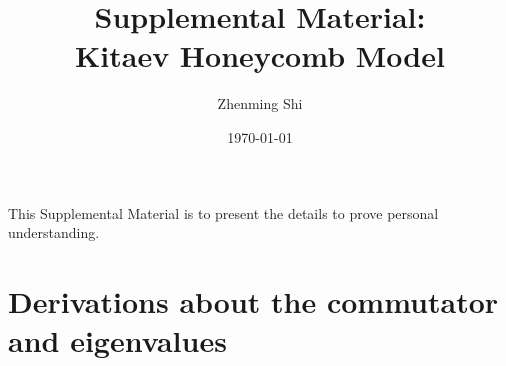 \documentclass[
  aps,
  prl,
  preprint,
  amsmath,
  amssymb,
  superscriptaddress,
  floatfix
]{revtex4-2}
\begin{document}
\title{Supplemental Material:\\ Kitaev Honeycomb Model}
\author{Zhenming Shi}
\date{\today}
\maketitle

\setcounter{secnumdepth}{3}

This Supplemental Material is to present the details to prove personal understanding.
\section{Derivations about the commutator and eigenvalues}
\end{document}
